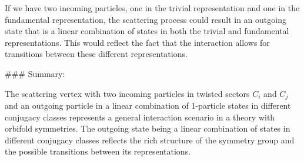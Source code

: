 If we have two incoming particles, one in the trivial representation and one in the fundamental representation, the scattering process could result in an outgoing state that is a linear combination of states in both the trivial and fundamental representations. This would reflect the fact that the interaction allows for transitions between these different representations.

### Summary:

The scattering vertex with two incoming particles in twisted sectors \(C_i\) and \(C_j\) and an outgoing particle in a linear combination of 1-particle states in different conjugacy classes represents a general interaction scenario in a theory with orbifold symmetries. The outgoing state being a linear combination of states in different conjugacy classes reflects the rich structure of the symmetry group and the possible transitions between its representations.